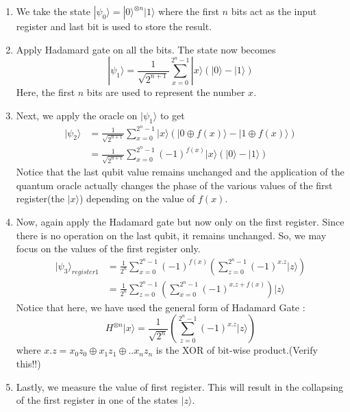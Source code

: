 \begin{enumerate}
\item We take the state $|\psi_0\rangle = |0\rangle ^{\otimes n} |1\rangle$ where the first $n$ bits act as the input register and last bit is used to store the result.
\item Apply Hadamard gate on all the bits. The state now becomes \begin{equation}
|\psi_1\rangle = \frac{1}{\sqrt{2^{n+1}}}\sum_{x=0}^{2^n -1} |x\rangle (|0\rangle - |1\rangle)
\end{equation}Here, the first $n$ bits are used to represent the number $x$.
\item Next, we apply the oracle on $|\psi_1\rangle$ to get \begin{equation} \begin{split}
|\psi_2\rangle &= \frac{1}{\sqrt{2^{n+1}}}\sum_{x=0}^{2^n -1} |x\rangle (|0 \oplus f(x)\rangle - |1 \oplus f(x)\rangle)\\
&= \frac{1}{\sqrt{2^{n+1}}}\sum_{x=0}^{2^n -1} (-1)^{f(x)} |x\rangle (|0 \rangle - |1 \rangle)
\end{split}
\end{equation}Notice that the last qubit value remains unchanged and the application of the quantum oracle actually changes the phase of the various values of the first register(the $|x\rangle$) depending on the value of $f(x)$.
\item Now, again apply the Hadamard gate but now only on the first register. Since there is no operation on the last qubit, it remains unchanged. So, we may focus on the values of the first register only.\begin{equation}
\begin{split}
|\psi_3\rangle_{register1} & = \frac{1}{2^{n}} \sum_{x=0}^{2^n -1} (-1)^{f(x)}  \left(\sum_{z=0}^{2^n-1} (-1)^{x.z} |z\rangle \right)\\
& = \frac{1}{2^{n}} \sum_{z=0}^{2^n -1} \left(\sum_{x=0}^{2^n-1} (-1)^{x.z + f(x)} \right)|z\rangle 
\end{split}
\end{equation}Notice that here, we have used the general form of Hadamard Gate :\begin{equation}
H^{\otimes n}|x\rangle= \frac{1}{\sqrt{2^n}}\left(\sum_{z=0}^{2^n-1} (-1)^{x.z} |z\rangle \right)
\end{equation}where $x.z = x_0z_0 \oplus x_1z_1 \oplus .. x_nz_n $ is the XOR of bit-wise product.(Verify this!!)
\item Lastly, we measure the value of first register. This will result in the collapsing of the first register in one of the states $|z\rangle$.

\end{enumerate}
